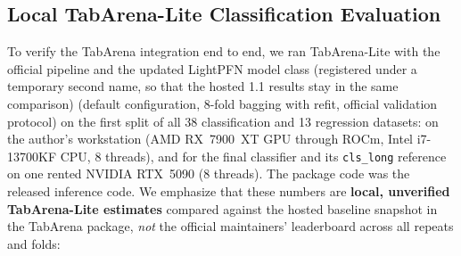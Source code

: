 \documentclass[11pt]{article}
\begin{document}
\subsection{Local TabArena-Lite Classification Evaluation}
\label{sec:cls-lite}

To verify the TabArena integration end to end, we ran TabArena-Lite \cite{tabarena} with the official pipeline and the updated LightPFN model class (registered under a temporary second name, so that the hosted 1.1 results stay in the same comparison) (default configuration, 8-fold bagging with refit, official validation protocol) on the first split of all 38 classification and 13 regression datasets: on the author's workstation (AMD RX~7900~XT GPU through ROCm, Intel i7-13700KF CPU, 8 threads), and for the final classifier and its \texttt{cls\_long} reference on one rented NVIDIA RTX~5090 (8 threads). The package code was the released inference code. %
We emphasize that these numbers are \textbf{local, unverified TabArena-Lite estimates} compared against the hosted baseline snapshot in the TabArena package, \emph{not} the official maintainers' leaderboard across all repeats and folds:
\end{document}
